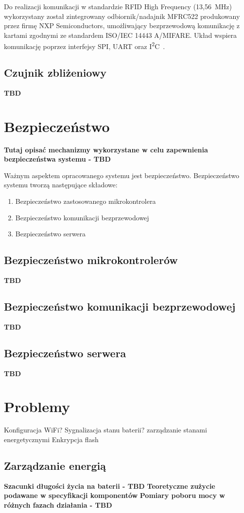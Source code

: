             Do realizacji komunikacji w standardzie RFID High Frequency (13,56~MHz) wykorzystany został zintegrowany odbiornik/nadajnik MFRC522 produkowany przez firmę NXP Semiconductors, umożliwający bezprzewodową komunikację z kartami zgodnymi ze standardem ISO/IEC 14443 A/MIFARE. Układ wspiera komunikację poprzez interfejsy SPI, UART oraz I\textsuperscript{2}C~\cite{mfrc522-ds}.

        \subsection{Czujnik zbliżeniowy}
            \textbf{TBD}

    \section{Bezpieczeństwo}

        \textbf{Tutaj opisać mechanizmy wykorzystane w celu zapewnienia bezpieczeństwa systemu - TBD}

        Ważnym aspektem opracowanego systemu jest bezpieczeństwo. Bezpieczeństwo systemu tworzą następujące składowe:
            \begin{enumerate}
                \item Bezpieczeństwo zastosowanego mikrokontrolera
                \item Bezpieczeństwo komunikacji bezprzewodowej
                \item Bezpieczeństwo serwera
            \end{enumerate}

            \subsection{Bezpieczeństwo mikrokontrolerów}
                \textbf{TBD}

            \subsection{Bezpieczeństwo komunikacji bezprzewodowej}
                \textbf{TBD}

            \subsection{Bezpieczeństwo serwera}
                \textbf{TBD}


    \section{Problemy}

        Konfiguracja WiFi?
        Sygnalizacja stanu baterii?
        zarządzanie stanami energetycznymi
        Enkrypcja flash

        \subsection{Zarządzanie energią}

            \textbf{Szacunki długości życia na baterii - TBD}
            \textbf{Teoretyczne zużycie podawane w specyfikacji komponentów}
            \textbf{Pomiary poboru mocy w różnych fazach działania - TBD}